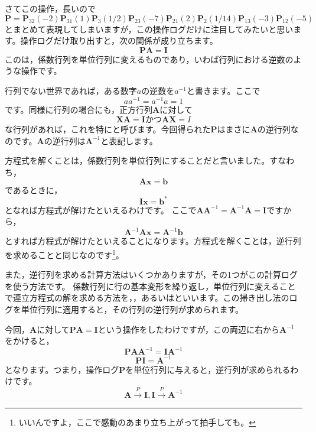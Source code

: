 \documentclass{ltjsbook}
\begin{document}
さてこの操作，長いので
\[ \bm{P} = \bm{P}_{32}(-2)\bm{P}_{31}(1)\bm{P}_{3}(1/2)\bm{P}_{23}(-7)\bm{P}_{21}(2)\bm{P}_{2}(1/14)\bm{P}_{13}(-3)\bm{P}_{12}(-5) \]
とまとめて表現してしまいますが，この操作ログだけに注目してみたいと思います。操作ログだけ取り出すと，次の関係が成り立ちます。
\[ \bm{PA} =  \bm{I} \]
このは，係数行列を単位行列に変えるものであり，いわば行列における逆数のような操作です。

行列でない世界であれば，ある数字$a$の逆数を$a^{-1}$と書きます。ここで
\[ a a^{-1}=a^{-1}a = 1 \]
です。同様に行列の場合にも，正方行列$\bm{A}$に対して
\[ \bm{XA} = \bm{I} \text{かつ} \bm{AX} = I \]
な行列があれば，これを特にと呼びます。今回得られた$\bm{P}$はまさに$\bm{A}$の逆行列なのです。$\bm{A}$の逆行列は$\bm{A}^{-1}$と表記します。

方程式を解くことは，係数行列を単位行列にすることだと言いました。すなわち，
\[ \bm{Ax} = \bm{b} \]
であるときに，
\[ \bm{Ix} = \bm{b}^{\ast} \]
となれば方程式が解けたといえるわけです。
ここで$\bm{AA}^{-1} = \bm{A}^{-1}\bm{A} = \bm{I}$ですから，
\[ \bm{A}^{-1}\bm{Ax} = \bm{A}^{-1}\bm{b} \]
とすれば方程式が解けたといえることになります。方程式を解くことは，逆行列を求めることと同じなのです\footnote{いいんですよ，ここで感動のあまり立ち上がって拍手しても。}。

また，逆行列を求める計算方法はいくつかありますが，その1つがこの計算ログを使う方法です。
係数行列に行の基本変形を繰り返し，単位行列に変えることで連立方程式の解を求める方法を，，あるいはといいます。この掃き出し法のログを単位行列に適用すると，その行列の逆行列が求められます。

今回，$\bm{A}$に対して$\bm{PA}=\bm{I}$という操作をしたわけですが，この両辺に右から$\bm{A}^{-1}$をかけると，
\[ \bm{PA}\bm{A}^{-1}  = \bm{I}\bm{A}^{-1} \]
\[ \bm{PI} = \bm{A}^{-1} \]
となります。つまり，操作ログ$\bm{P}$を単位行列に与えると，逆行列が求められるわけです。
\[ \bm{A}\xrightarrow{P}\bm{I}, \bm{I}\xrightarrow{P}\bm{A}^{-1}\]
\end{document}
